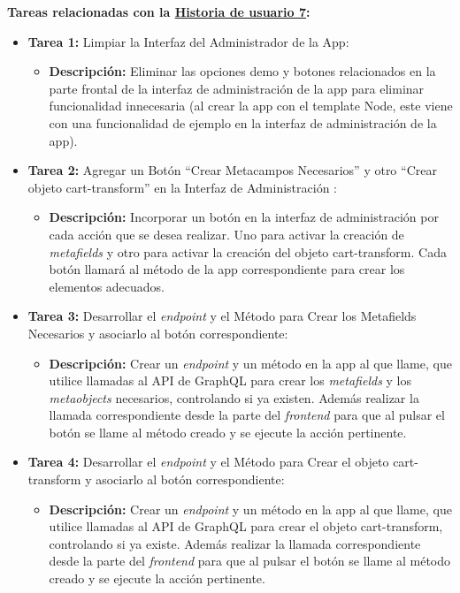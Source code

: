 \documentclass[11pt]{article}
\begin{document}
\textbf{Tareas relacionadas con la \hyperref[sec:historia7]{Historia de usuario 7}:}
\begin{itemize}
    \item \textbf{Tarea 1:} Limpiar la Interfaz del Administrador de la App:
          \begin{itemize}[label=--]
              \item \textbf{Descripción:} Eliminar las opciones demo y botones relacionados en la parte frontal de la interfaz de administración de la app para eliminar funcionalidad innecesaria (al crear la app con el template Node, este viene con una funcionalidad de ejemplo en la interfaz de administración de la app).
          \end{itemize}
    \item \textbf{Tarea 2:} Agregar un Botón ``Crear Metacampos Necesarios'' y otro ``Crear objeto cart-transform'' en la Interfaz de Administración :
          \begin{itemize}[label=--]
              \item \textbf{Descripción:} Incorporar un botón en la interfaz de administración por cada acción que se desea realizar. Uno para activar la creación de \textit{metafields} y otro para activar la creación del objeto cart-transform. Cada botón llamará al método de la app correspondiente para crear los elementos adecuados.
          \end{itemize}
    \item \textbf{Tarea 3:} Desarrollar el \textit{endpoint} y el Método para Crear los Metafields Necesarios y asociarlo al botón correspondiente:
          \begin{itemize}[label=--]
              \item \textbf{Descripción:} Crear un \textit{endpoint} y un método en la app al que llame, que utilice llamadas al API de GraphQL para crear los \textit{metafields} y los \textit{metaobjects} necesarios, controlando si ya existen. Además realizar la llamada correspondiente desde la parte del \textit{frontend} para que al pulsar el botón se llame al método creado y se ejecute la acción pertinente.
          \end{itemize}
    \item \textbf{Tarea 4:} Desarrollar el \textit{endpoint} y el Método para Crear el objeto cart-transform y asociarlo al botón correspondiente:
          \begin{itemize}[label=--]
              \item \textbf{Descripción:} Crear un \textit{endpoint} y un método en la app al que llame, que utilice llamadas al API de GraphQL para crear el objeto cart-transform, controlando si ya existe. Además realizar la llamada correspondiente desde la parte del \textit{frontend} para que al pulsar el botón se llame al método creado y se ejecute la acción pertinente.

\end{itemize}
\end{itemize}
\end{document}
